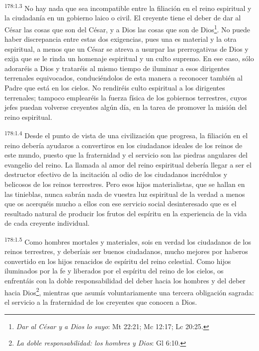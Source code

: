 \par
\textsuperscript{178:1.3} No hay nada que sea incompatible entre la filiación en el reino espiritual y la ciudadanía en un gobierno laico o civil. El creyente tiene el deber de dar al César las cosas que son del César, y a Dios las cosas que son de Dios\footnote{\textit{Dar al César y a Dios lo suyo}: Mt 22:21; Mc 12:17; Lc 20:25.}. No puede haber discrepancia entre estas dos exigencias, pues una es material y la otra espiritual, a menos que un César se atreva a usurpar las prerrogativas de Dios y exija que se le rinda un homenaje espiritual y un culto supremo. En ese caso, sólo adoraréis a Dios y trataréis al mismo tiempo de iluminar a esos dirigentes terrenales equivocados, conduciéndolos de esta manera a reconocer también al Padre que está en los cielos. No rendiréis culto espiritual a los dirigentes terrenales; tampoco emplearéis la fuerza física de los gobiernos terrestres, cuyos jefes puedan volverse creyentes algún día, en la tarea de promover la misión del reino espiritual.

\par
\textsuperscript{178:1.4} Desde el punto de vista de una civilización que progresa, la filiación en el reino debería ayudaros a convertiros en los ciudadanos ideales de los reinos de este mundo, puesto que la fraternidad y el servicio son las piedras angulares del evangelio del reino. La llamada al amor del reino espiritual debería llegar a ser el destructor efectivo de la incitación al odio de los ciudadanos incrédulos y belicosos de los reinos terrestres. Pero esos hijos materialistas, que se hallan en las tinieblas, nunca sabrán nada de vuestra luz espiritual de la verdad a menos que os acerquéis mucho a ellos con ese servicio social desinteresado que es el resultado natural de producir los frutos del espíritu en la experiencia de la vida de cada creyente individual.

\par
\textsuperscript{178:1.5} Como hombres mortales y materiales, sois en verdad los ciudadanos de los reinos terrestres, y deberíais ser buenos ciudadanos, mucho mejores por haberos convertido en los hijos renacidos de espíritu del reino celestial. Como hijos iluminados por la fe y liberados por el espíritu del reino de los cielos, os enfrentáis con la doble responsabilidad del deber hacia los hombres y del deber hacia Dios\footnote{\textit{La doble responsabilidad: los hombres y Dios}: Gl 6:10.}, mientras que asumís voluntariamente una tercera obligación sagrada: el servicio a la fraternidad de los creyentes que conocen a Dios.

